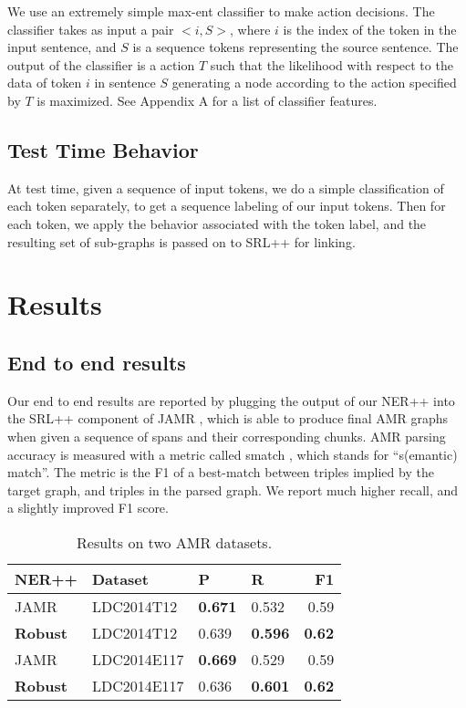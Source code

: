 \documentclass[11pt]{article}
\begin{document}

We use an extremely simple max-ent classifier to make action decisions. The classifier takes as input a pair $< i, S >$, where $i$ is the index of the token in the input sentence, and $S$ is a sequence tokens representing the source sentence. The output of the classifier is a action $T$ such that the likelihood with respect to the data of token $i$ in sentence $S$ generating a node according to the action specified by $T$ is maximized. See Appendix A for a list of classifier features.

\subsection{Test Time Behavior}

At test time, given a sequence of input tokens, we do a simple classification of each token separately, to get a sequence labeling of our input tokens. Then for each token, we apply the behavior associated with the token label, and the resulting set of sub-graphs is passed on to SRL++ for linking.

% 

\section{Results}

\subsection{End to end results}

Our end to end results are reported by plugging the output of our NER++ into the SRL++ component of JAMR \cite{Flanigan:14}, which is able to produce final AMR graphs when given a sequence of spans and their corresponding chunks. AMR parsing accuracy is measured with a metric called smatch \needcite, which stands for ``s(emantic) match''. The metric is the F1 of a best-match between triples implied by the target graph, and triples in the parsed graph. We report much higher recall, and a slightly improved F1 score.

\begin{table}[h]
\begin{center}
\begin{tabular}{|l|l|l|l|r|}
\hline NER++ & Dataset & P & R & \bf F1 \\ \hline
JAMR & LDC2014T12 & \textbf{0.671} & 0.532 & 0.59 \\
\textbf{Robust} & LDC2014T12 & 0.639 & \textbf{0.596} & \textbf{0.62} \\
JAMR & LDC2014E117 & \textbf{0.669} & 0.529 & 0.59 \\
\bf Robust & LDC2014E117 & 0.636 & \textbf{0.601} & \textbf{0.62} \\
\hline
\end{tabular}
\end{center}
\caption{\label{font-table} Results on two AMR datasets. }
\end{table}
\end{document}

